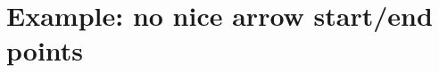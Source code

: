 \documentclass[,%
	paper=25cm:25cm,%
	DIV22,
	liststotoc,
	bibtotoc,
	draft=false,%
	numbers=noendperiod
]{scrartcl}
\theoremstyle{definition}
\newcommand{\sig}[1]{\stackrel{\Sigma}{#1}}
\newcommand{\p}[1]{\stackrel{\Pi}{#1}}
\newcommand{\e}[1]{\vskip .7em   \subsection*{#1}}
\begin{document}
\begin{comment}
\e{211b'}
\begin{prooftree}
	\AxiomCm{\sig{Q(\hb x) \lor P(f(\hb x))}}
	\AxiomCm{\sig{R(\ha y) \lor \lnot P(f(\ha y))}}
	\BinaryInfCm{ P(\arrowB\,\arrowF f(x)) \mid Q(\arrowA x) \lor R(\arrowE x)  }\drawAB\drawEF
	\noLine\UnaryInfC{}
	\AxiomCm{\p{\lnot Q(a)}}
	\BinaryInfCm{ P(\arrowB\,\arrowF f(a)) \lor  Q(\arrowA a) \mid  R(\arrowE a)  }\drawAB\drawEF
	\noLine\UnaryInfC{}\noLine\UnaryInfC{\wrong{conjecture: $Q$ and $R$ do not need arrows as they are lifted by the same variable anyway, so constraints on $Q$ do the work}}
\end{prooftree}

\e{211c}
\begin{prooftree}
	\AxiomCm{ \sig{ Q(\arrowB f(x))\lor R(\arrowA x) } }\drawAB
	\noLine\UnaryInfC{}
	\AxiomCm{ \p{ \lnot R(g(y)) } }
	\BinaryInfCm{ Q(\arrowB f(g(y))) \lor R(\arrowA g(y)) }\drawAB
	\noLine\UnaryInfC{}
\end{prooftree}
Have same var but no merge arrow. The whole term $g(y)$ is somehow the ``travelling term'', there is no ``renaming''.

\e{211d -- problem cases with lemma grey->colored}

~

\begin{prooftree}
	\AxiomCm{ Q(\arrA\,\arrC y) \lor Q'(\arrE z) \lor P(\arrB f(y)) \lor R(\arrD g(y), \arrF g'(z)) } \drawAB \drawEF\drawCD
	\noLine\UnaryInfC{}
	\AxiomCm{ \lnot R(g(h(x)), g'(x)) }
	\noLine\UnaryInfC{}
	\RightLabelm{y \mapsto h(x), z \mapsto x}
	\BinaryInfCm{ R(g(h(x)), g'(x)) \mid Q( h(x)) \lor Q'(x) \lor P(f(h(x))) }
	\noLine\UnaryInfC{\NB{this is different since $x$ occurs grey as well}}
\end{prooftree}


~

~

\begin{prooftree}
	\AxiomCm{  Q'(\arrE z) \lor P(\arrC f(y)) \lor R(\arrD g(f(y)), \arrF g'(z)) } \drawEF\drawCD
	\noLine\UnaryInfC{}
	\AxiomCm{ \lnot R(g(h(x)), g'(x)) }
	\noLine\UnaryInfC{}
	\BinaryInfCm{ R(g(h(x)), g'(x)) \mid Q( h(x)) \lor  P(f(h(x))) }
\end{prooftree}


\clearpage
\end{comment}

\section*{Example: no nice arrow start/end points}
\end{document}
